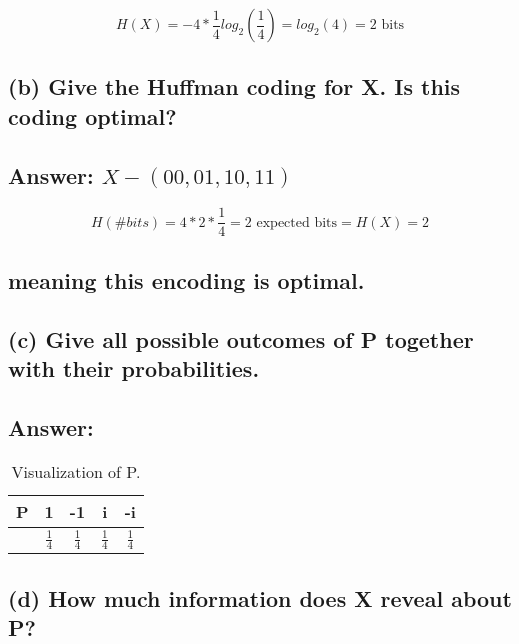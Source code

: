 \documentclass[11px]{article}
\begin{document}
\begin{equation}
H(X) = -4*\frac{1}{4}log_2(\frac{1}{4}) = log_2(4) = 2 \text{ bits}
\end{equation}

\subsection*{\normalfont (b) Give the Huffman coding for X. Is this coding optimal?}

\subsection*{Answer: $X - (00, 01, 10, 11)$}

\begin{equation}
H(\#bits) = 4*2*\frac{1}{4} = 2 \text{ expected bits} = H(X) = 2
\end{equation}

\subsection*{meaning this encoding is optimal.}

\subsection*{\normalfont (c) Give all possible outcomes of P together with their probabilities.}

\subsection*{Answer:}

\begin{table}[ht]
\centering
\begin{adjustbox}{width=0.5\linewidth}
\begin{tabular}{c|c|c|c|c|}

  P  & 1 & -1 & i & -i \\ \hline
     & \(\frac{1}{4}\) & \(\frac{1}{4}\) & \(\frac{1}{4}\) & \(\frac{1}{4}\) \\
\end{tabular}
\end{adjustbox}
\caption{Visualization of P.} 
\end{table}

\subsection*{\normalfont (d) How much information does X reveal about P?}
\end{document}
